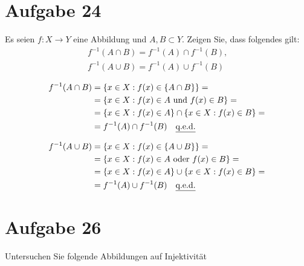 \documentclass[10pt, oneside]{article}
\begin{document}
\section{Aufgabe 24}

Es seien $f : X \rightarrow Y$ eine Abbildung und $A, B \subset Y$. Zeigen Sie,
dass folgendes gilt:
\begin{equation*}
    \begin{gathered}
        f^{-1}(A \cap B) = f^{-1}(A) \cap f^{-1}(B)\text{,}\\
        f^{-1}(A \cup B) = f^{-1}(A) \cup f^{-1}(B)
    \end{gathered}
\end{equation*}

\begin{equation*}
    \begin{aligned}
        f^{-1}(A \cap B) &= \{x \in X : f(x) \in \{A \cap B\}\} = \\
                         &= \{x \in X : f(x) \in A \text{ und } f(x) \in B\} = \\
                         &= \{x \in X : f(x) \in A\} \cap \{x \in X : f(x) \in B\} = \\
                         &= f^{-1}(A) \cap f^{-1}(B) \quad \text{\underline{q.e.d.}}
    \end{aligned}
\end{equation*}

\begin{equation*}
    \begin{aligned}
        f^{-1}(A \cup B) &= \{x \in X : f(x) \in \{A \cup B\}\} = \\
                         &= \{x \in X : f(x) \in A \text{ oder } f(x) \in B\} = \\
                         &= \{x \in X : f(x) \in A\} \cup \{x \in X : f(x) \in B\} = \\
                         &= f^{-1}(A) \cup f^{-1}(B) \quad \text{\underline{q.e.d.}}
    \end{aligned}
\end{equation*}

\section{Aufgabe 26}

Untersuchen Sie folgende Abbildungen auf Injektivität
\end{document}
